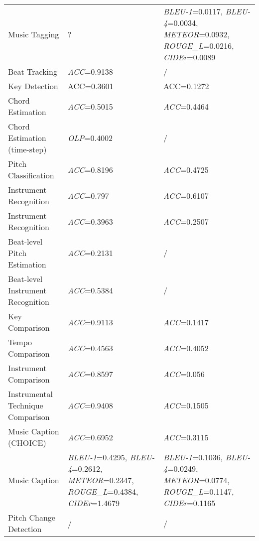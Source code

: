\begin{longtable}[hbtp]{p{4.6cm}<{\raggedright}p{4.5cm}<{\raggedright}p{4.5cm}<{\raggedright}}
    Music Tagging & ? & \textit{BLEU-1}=0.0117, \textit{BLEU-4}=0.0034, \textit{METEOR}=0.0932, \textit{ROUGE\_L}=0.0216, \textit{CIDEr}=0.0089 \\ %
    Beat Tracking & \textit{ACC}=0.9138 & / \\
    Key Detection & ACC=0.3601 & ACC=0.1272 \\
    Chord Estimation & \textit{ACC}=0.5015 & \textit{ACC}=0.4464\\
    Chord Estimation (time-step) & \textit{OLP}=0.4002 & / \\
    Pitch Classification & \textit{ACC}=0.8196 & \textit{ACC}=0.4725 \\ %
    Instrument Recognition & \textit{ACC}=0.797 & \textit{ACC}=0.6107\\ %
    Instrument Recognition & \textit{ACC}=0.3963 & \textit{ACC}=0.2507\\ %
    
    Beat-level Pitch Estimation & \textit{ACC}=0.2131 & /\\
    Beat-level Instrument Recognition & \textit{ACC}=0.5384 & /\\
       
    Key Comparison & \textit{ACC}=0.9113 & \textit{ACC}=0.1417 \\
    Tempo Comparison & \textit{ACC}=0.4563 & \textit{ACC}=0.4052 \\
    Instrument Comparison & \textit{ACC}=0.8597	& \textit{ACC}=0.056 \\
    Instrumental Technique Comparison & \textit{ACC}=0.9408	& \textit{ACC}=0.1505\\
    
    Music Caption (CHOICE) & \textit{ACC}=0.6952 & \textit{ACC}=0.3115\\
    Music Caption & \textit{BLEU-1}=0.4295, \textit{BLEU-4}=0.2612, \textit{METEOR}=0.2347, \textit{ROUGE\_L}=0.4384, \textit{CIDEr}=1.4679 & \textit{BLEU-1}=0.1036, \textit{BLEU-4}=0.0249, \textit{METEOR}=0.0774, \textit{ROUGE\_L}=0.1147, \textit{CIDEr}=0.1165\\
    Pitch Change Detection & / & / \\


\end{longtable}
